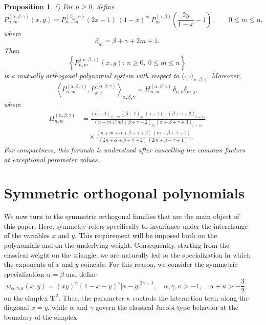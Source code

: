 \documentclass[reqno,10pt]{amsart}
\theoremstyle{plain}
\newtheorem{proposition}[theorem]{Proposition}
\numberwithin{equation}{section}
\numberwithin{figure}{section}
\begin{document}
\begin{proposition}(\cite[p.~35]{DX14})
For $n\ge 0$, define
\[
P_{n,m}^{(\alpha,\beta,\gamma)}(x,y)
=
P_{n-m}^{(\beta_m,\alpha)}(2x-1)\,(1-x)^m\,
P_m^{(\gamma,\beta)}\!\left(\frac{2y}{1-x}-1\right),
\qquad 0\le m\le n,
\]
where
\[
\beta_m=\beta+\gamma+2m+1.
\]
Then
\[
\left\{
P_{n,m}^{(\alpha,\beta,\gamma)}(x,y):\ n\ge 0,\ 0\le m\le n
\right\}
\]
is a mutually orthogonal polynomial system with respect to $\langle\cdot,\cdot\rangle_{\alpha,\beta,\gamma}$. Moreover,
\[
\left\langle
P_{n,m}^{(\alpha,\beta,\gamma)},
P_{k,j}^{(\alpha,\beta,\gamma)}
\right\rangle_{\alpha,\beta,\gamma}
=
H_{n,m}^{(\alpha,\beta,\gamma)}\,
\delta_{n,k}\delta_{m,j},
\]
where
\begin{align*}
H_{n,m}^{(\alpha,\beta,\gamma)}
&=
\frac{
(\alpha+1)_{n-m}\,
(\beta+1)_m\,
(\gamma+1)_m\,
(\beta+\gamma+2)_{n+m}
}{
(n-m)!\,m!\,(\beta+\gamma+2)_m\,(\alpha+\beta+\gamma+3)_{n+m}
}\\
&\quad \times
\frac{
(n+m+\alpha+\beta+\gamma+2)\,(m+\beta+\gamma+1)
}{
(2n+\alpha+\beta+\gamma+2)\,(2m+\beta+\gamma+1)
}.
\end{align*}
For compactness, this formula is understood after cancelling the common
factors at exceptional parameter values.
\end{proposition}





\section{Symmetric orthogonal polynomials}\label{sec:symmetric-polys}

We now turn to the symmetric orthogonal families that are the main object of this paper. Here, symmetry refers specifically to invariance under the interchange of the variables $x$ and $y$. This requirement will be imposed both on the polynomials and on the underlying weight. Consequently, starting from the classical weight on the triangle, we are naturally led to the specialization in which the exponents of $x$ and $y$ coincide. For this reason, we consider the symmetric specialization $\alpha=\beta$ and define
\[
w_{\alpha,\gamma,\kappa}(x,y)
=
(xy)^{\alpha}(1-x-y)^{\gamma}|x-y|^{2\kappa+1},
\quad \alpha,\gamma,\kappa>-1,\quad \alpha+\kappa>-\frac32,
\]
on the simplex $\mathbf{T}^2$. Thus, the parameter $\kappa$ controls the interaction term along the diagonal $x=y$, while $\alpha$ and $\gamma$ govern the classical Jacobi-type behavior at the boundary of the simplex.
\end{document}
